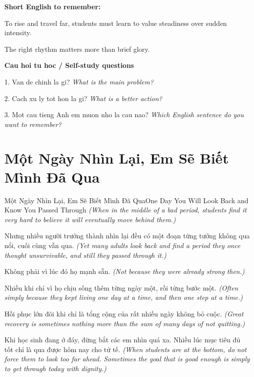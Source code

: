 \begin{ghinhoanh}
\textbf{Short English to remember:}

To rise and travel far, students must learn to value steadiness over sudden intensity.

The right rhythm matters more than brief glory.

\end{ghinhoanh}

\begin{tuhocnhanh}
\textbf{Cau hoi tu hoc / Self-study questions}

1. Van de chinh la gi? \textit{What is the main problem?}

2. Cach xu ly tot hon la gi? \textit{What is a better action?}

3. Mot cau tieng Anh em muon nho la cau nao? \textit{Which English sentence do you want to remember?}
\end{tuhocnhanh}
\ngancach

\section{Một Ngày Nhìn Lại, Em Sẽ Biết Mình Đã Qua}
\begin{truyen}{Một Ngày Nhìn Lại, Em Sẽ Biết Mình Đã Qua}{One Day You Will Look Back and Know You Passed Through}
\textit{(When in the middle of a bad period, students find it very hard to believe it will eventually move behind them.)}

Nhưng nhiều người trưởng thành nhìn lại đều có một đoạn từng tưởng không qua nổi, cuối cùng vẫn qua.
\textit{(Yet many adults look back and find a period they once thought unsurvivable, and still they passed through it.)}

Không phải vì lúc đó họ mạnh sẵn.
\textit{(Not because they were already strong then.)}

Nhiều khi chỉ vì họ chịu sống thêm từng ngày một, rồi từng bước một.
\textit{(Often simply because they kept living one day at a time, and then one step at a time.)}

Hồi phục lớn đôi khi chỉ là tổng cộng của rất nhiều ngày không bỏ cuộc.
\textit{(Great recovery is sometimes nothing more than the sum of many days of not quitting.)}

\end{truyen}

\begin{baihoc}
Khi học sinh đang ở đáy, đừng bắt các em nhìn quá xa. Nhiều lúc mục tiêu đủ tốt chỉ là qua được hôm nay cho tử tế.
\textit{(When students are at the bottom, do not force them to look too far ahead. Sometimes the goal that is good enough is simply to get through today with dignity.)}
\end{baihoc}

